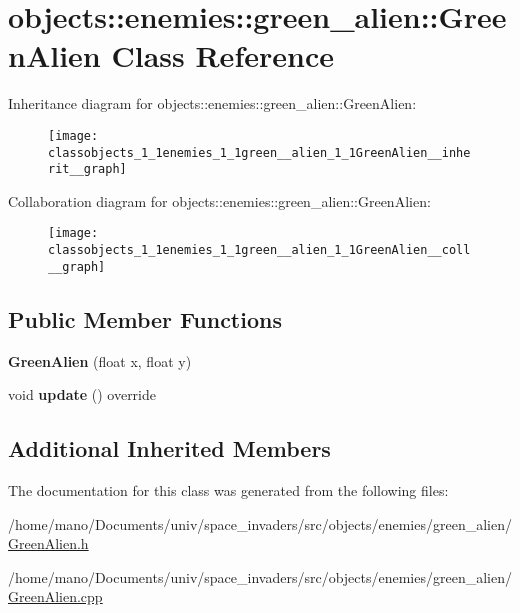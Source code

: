 \hypertarget{classobjects_1_1enemies_1_1green__alien_1_1GreenAlien}{}\section{objects\+:\+:enemies\+:\+:green\+\_\+alien\+:\+:Green\+Alien Class Reference}
\label{classobjects_1_1enemies_1_1green__alien_1_1GreenAlien}


Inheritance diagram for objects\+:\+:enemies\+:\+:green\+\_\+alien\+:\+:Green\+Alien\+:\nopagebreak
\begin{figure}[H]
\begin{center}
\leavevmode
\texttt{[image: classobjects\_1\_1enemies\_1\_1green\_\_alien\_1\_1GreenAlien\_\_inherit\_\_graph]}
\end{center}
\end{figure}


Collaboration diagram for objects\+:\+:enemies\+:\+:green\+\_\+alien\+:\+:Green\+Alien\+:\nopagebreak
\begin{figure}[H]
\begin{center}
\leavevmode
\texttt{[image: classobjects\_1\_1enemies\_1\_1green\_\_alien\_1\_1GreenAlien\_\_coll\_\_graph]}
\end{center}
\end{figure}
\subsection*{Public Member Functions}
\begin{DoxyCompactItemize}
\item 
\mbox{\label{classobjects_1_1enemies_1_1green__alien_1_1GreenAlien_a77d12c28dac45b2ffacfa717ea32f139}}
{\bfseries Green\+Alien} (float x, float y)
\item 
\mbox{\label{classobjects_1_1enemies_1_1green__alien_1_1GreenAlien_a8489bee31c00c660f067172a97d3121d}}
void {\bfseries update} () override
\end{DoxyCompactItemize}
\subsection*{Additional Inherited Members}


The documentation for this class was generated from the following files\+:\begin{DoxyCompactItemize}
\item 
/home/mano/\+Documents/univ/space\+\_\+invaders/src/objects/enemies/green\+\_\+alien/\hyperlink{GreenAlien_8h}{Green\+Alien.\+h}\item
/home/mano/\+Documents/univ/space\+\_\+invaders/src/objects/enemies/green\+\_\+alien/\hyperlink{GreenAlien_8cpp}{Green\+Alien.\+cpp}\end{DoxyCompactItemize}
